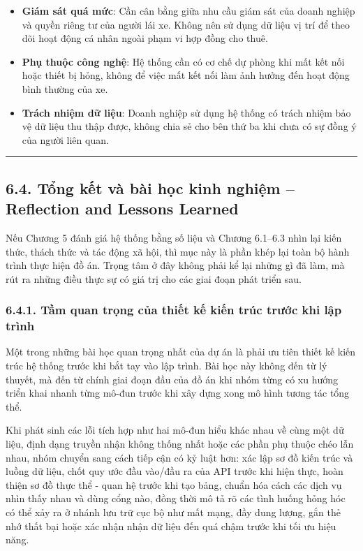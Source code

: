 \documentclass[a4paper]{extarticle}
\providecommand{\tightlist}{%
  \setlength{\itemsep}{0pt}\setlength{\parskip}{0pt}}
\begin{document}
\begin{itemize}
\tightlist
\item
  \textbf{Giám sát quá mức}: Cần cân bằng giữa nhu cầu giám sát của
  doanh nghiệp và quyền riêng tư của người lái xe. Không nên sử dụng dữ
  liệu vị trí để theo dõi hoạt động cá nhân ngoài phạm vi hợp đồng cho
  thuê.
\item
  \textbf{Phụ thuộc công nghệ}: Hệ thống cần có cơ chế dự phòng
  khi mất kết nối hoặc thiết bị hỏng, không để việc mất kết
  nối làm ảnh hưởng đến hoạt động bình thường của xe.
\item
  \textbf{Trách nhiệm dữ liệu}: Doanh nghiệp sử dụng hệ thống có trách
  nhiệm bảo vệ dữ liệu thu thập được, không chia sẻ cho bên thứ ba khi
  chưa có sự đồng ý của người liên quan.
\end{itemize}

\begin{center}\rule{0.5\linewidth}{0.5pt}\end{center}

\subsection{6.4. Tổng kết và bài học kinh nghiệm -- Reflection and Lessons Learned}\label{64-tux1ed5ng-kux1ebft-vuxe0-buxe0i-hux1ecdc-kinh-nghiux1ec7m--reflection-and-lessons-learned}

Nếu Chương 5 đánh giá hệ thống bằng số liệu và Chương 6.1--6.3 nhìn lại
kiến thức, thách thức và tác động xã hội, thì mục này là phần khép lại
toàn bộ hành trình thực hiện đồ án. Trọng tâm ở đây không phải kể lại
những gì đã làm, mà rút ra những điều thực sự có giá trị cho các giai
đoạn phát triển sau.

\subsubsection{6.4.1. Tầm quan trọng của thiết kế kiến trúc trước khi
lập
trình}\label{641-tux1ea7m-quan-trux1ecdng-cux1ee7a-thiux1ebft-kux1ebf-kiux1ebfn-truxfac-trux1b0ux1edbc-khi-lux1eadp-truxecnh}

Một trong những bài học quan trọng nhất của dự án là phải ưu tiên thiết
kế kiến trúc hệ thống trước khi bắt tay vào lập trình. Bài học này không
đến từ lý thuyết, mà đến từ chính giai đoạn đầu của đồ án khi nhóm từng
có xu hướng triển khai nhanh từng mô-đun trước khi xây dựng xong mô hình
tương tác tổng thể.

Khi phát sinh các lỗi tích hợp như hai mô-đun hiểu khác nhau về cùng một
dữ liệu, định dạng truyền nhận không thống nhất hoặc các phần phụ thuộc
chéo lẫn nhau, nhóm chuyển sang cách tiếp cận có kỷ luật hơn: xác lập sơ
đồ kiến trúc và luồng dữ liệu, chốt quy ước đầu vào/đầu ra của API trước
khi hiện thực, hoàn thiện sơ đồ thực thể - quan hệ trước khi tạo bảng,
chuẩn hóa cách các dịch vụ nhìn thấy nhau và dùng cổng nào, đồng thời mô
tả rõ các tình huống hỏng hóc có thể xảy ra ở nhánh lưu trữ cục bộ như
mất mạng, đầy dung lượng, gắn thẻ nhớ thất bại hoặc xác nhận nhận dữ
liệu đến quá chậm trước khi tối ưu hiệu năng.
\end{document}
